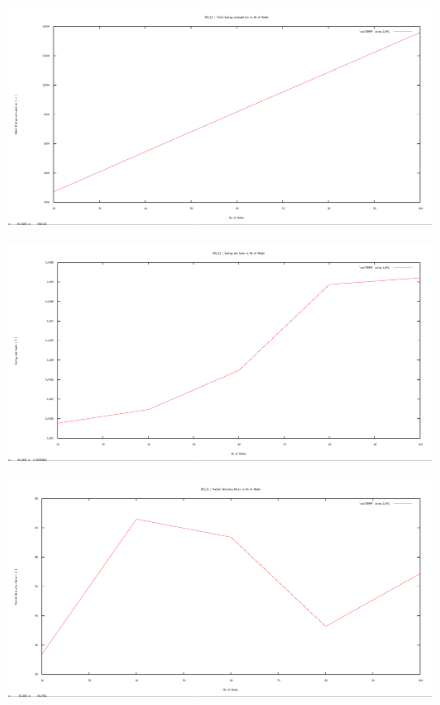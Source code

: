 \documentclass[12pt]{article}
\begin{document}
\begin{figure}[H]
	\centering
	\includegraphics[scale=	0.26]{image/802.11/Energyconsumption_vs_nodes.png}
\end{figure}

\begin{figure}[H]
	\centering
	\includegraphics[scale=	0.26]{image/802.11/Energyperbytes_vs_nodes.png}
\end{figure}

\begin{figure}[H]
	\centering
	\includegraphics[scale=	0.26]{image/802.11/Packetdeliveryratio_vs_nodes.png}
\end{figure}
\end{document}
